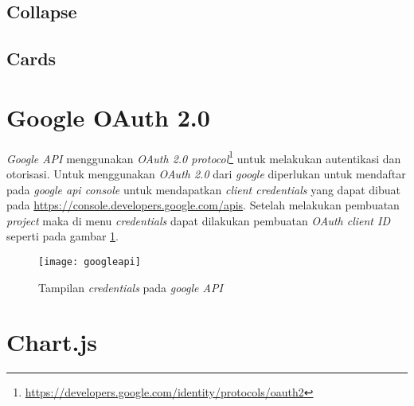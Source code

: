 \subsection{Collapse}
\subsection{Cards}

\section{Google OAuth 2.0}
\textit{Google API} menggunakan \textit{OAuth 2.0 protocol}\footnote{\url{https://developers.google.com/identity/protocols/oauth2}} untuk melakukan autentikasi dan otorisasi. Untuk menggunakan \textit{OAuth 2.0} dari \textit{google} diperlukan untuk mendaftar pada \textit{google api console} untuk mendapatkan \textit{client credentials} yang dapat dibuat pada \url{https://console.developers.google.com/apis}. Setelah melakukan pembuatan \textit{project} maka di menu \textit{credentials} dapat dilakukan pembuatan \textit{OAuth client ID} seperti pada gambar \ref{fig:googleapi}.

\begin{figure}[H]
	\centering
	\texttt{[image: googleapi]} 
	\caption{Tampilan \textit{credentials} pada \textit{google API}}
	\label{fig:googleapi} 
\end{figure}
\section{Chart.js}



 
